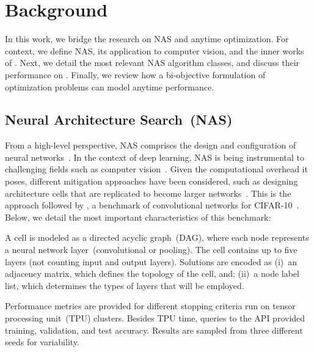 \section{Background}
\label{sec:background}

In this work, we bridge the research on NAS and anytime optimization. For context, we define NAS, its application to computer vision, and the inner works of \nasbench. Next, we detail the most relevant NAS algorithm classes, and discuss their performance on \nasbench. Finally, we review how a bi-objective formulation of optimization problems can model anytime performance.


\subsection{Neural Architecture Search~(NAS)}
From a high-level perspective, NAS comprises the design and configuration of neural networks~\cite{ElsMetHut2019nas-survey}. In the context of deep learning, NAS is being instrumental to challenging fields such as computer vision~\cite{ReaAggHuaLe2019re,ZopLe2017nas,ZopVasShlLeh2018scalable}. Given the computational
overhead it poses, different mitigation approaches have been considered, such as designing architecture cells that are replicated to become larger networks~\cite{ZopLe2017nas,ZopVasShlLeh2018scalable}. This is the approach followed by \nasbench, a benchmark of convolutional networks for CIFAR-10~\cite{Krizhevsky2009cifar}. Below, we detail the most important characteristics of this benchmark:

\begin{description}[style=unboxed, leftmargin=0px]
\item[Design space.] A cell is modeled as a directed acyclic graph~(DAG), where each node represents a neural network layer~(convolutional or pooling). The cell contains up to five layers (not counting input and output layers). Solutions are encoded as (i)~an adjacency matrix, which defines the topology of the cell, and; (ii)~a node label list, which determines the types of layers that will be employed. 
\item[Architecture evaluation.] Performance metrics are provided for different stopping criteria run on tensor processing unit~(TPU) clusters. Besides TPU time, queries to the API provided training, validation, and test accuracy. Results are sampled from three different seeds for variability.
\end{description}

